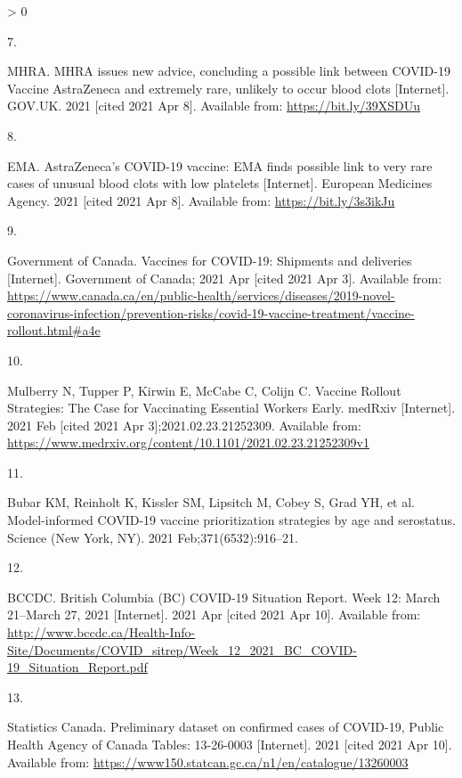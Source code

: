 \documentclass[]{elsarticle} %
\newlength{\csllabelwidth}
\newlength{\cslhangindent}
\newenvironment{CSLReferences}[3] %
 {%
  \setlength{\parindent}{0pt}
  \ifodd #1 \everypar{\setlength{\hangindent}{\cslhangindent}}\ignorespaces\fi
  \ifnum #2 > 0
  \setlength{\parskip}{#2\baselineskip}
  \fi
 }%
 {}
\newcommand{\CSLLeftMargin}[1]{\parbox[t]{\csllabelwidth}{#1}}
\newcommand{\CSLRightInline}[1]{\parbox[t]{\linewidth - \csllabelwidth}{#1}}
\begin{document}
\begin{CSLReferences}{0}{0}
\leavevmode\hypertarget{ref-mhra_mhra_2021}{}%
\CSLLeftMargin{7. }
\CSLRightInline{MHRA. {MHRA} issues new advice, concluding a possible
link between {COVID}-19 {Vaccine} {AstraZeneca} and extremely rare,
unlikely to occur blood clots {[}Internet{]}. GOV.UK. 2021 {[}cited 2021
Apr 8{]}. Available from: \url{https://bit.ly/39XSDUu}}

\leavevmode\hypertarget{ref-ema_astrazenecas_2021}{}%
\CSLLeftMargin{8. }
\CSLRightInline{EMA. {AstraZeneca}'s {COVID}-19 vaccine: {EMA} finds
possible link to very rare cases of unusual blood clots with low
platelets {[}Internet{]}. European Medicines Agency. 2021 {[}cited 2021
Apr 8{]}. Available from: \url{https://bit.ly/3s3ikJu}}

\leavevmode\hypertarget{ref-government_of_canada_vaccines_2021}{}%
\CSLLeftMargin{9. }
\CSLRightInline{Government of Canada. Vaccines for {COVID}-19:
{Shipments} and deliveries {[}Internet{]}. Government of Canada; 2021
Apr {[}cited 2021 Apr 3{]}. Available from:
\url{https://www.canada.ca/en/public-health/services/diseases/2019-novel-coronavirus-infection/prevention-risks/covid-19-vaccine-treatment/vaccine-rollout.html\#a4e}}

\leavevmode\hypertarget{ref-mulberry_vaccine_2021}{}%
\CSLLeftMargin{10. }
\CSLRightInline{Mulberry N, Tupper P, Kirwin E, McCabe C, Colijn C.
Vaccine {Rollout} {Strategies}: {The} {Case} for {Vaccinating}
{Essential} {Workers} {Early}. medRxiv {[}Internet{]}. 2021 Feb {[}cited
2021 Apr 3{]};2021.02.23.21252309. Available from:
\url{https://www.medrxiv.org/content/10.1101/2021.02.23.21252309v1}}

\leavevmode\hypertarget{ref-bubar_model-informed_2021}{}%
\CSLLeftMargin{11. }
\CSLRightInline{Bubar KM, Reinholt K, Kissler SM, Lipsitch M, Cobey S,
Grad YH, et al. Model-informed {COVID}-19 vaccine prioritization
strategies by age and serostatus. Science (New York, NY). 2021
Feb;371(6532):916--21. }

\leavevmode\hypertarget{ref-bccdc_british_2021}{}%
\CSLLeftMargin{12. }
\CSLRightInline{BCCDC. British {Columbia} ({BC}) {COVID}-19 {Situation}
{Report}. {Week} 12: {March} 21--{March} 27, 2021 {[}Internet{]}. 2021
Apr {[}cited 2021 Apr 10{]}. Available from:
\url{http://www.bccdc.ca/Health-Info-Site/Documents/COVID_sitrep/Week_12_2021_BC_COVID-19_Situation_Report.pdf}}

\leavevmode\hypertarget{ref-statistics_canada_preliminary_2021}{}%
\CSLLeftMargin{13. }
\CSLRightInline{Statistics Canada. Preliminary dataset on confirmed
cases of {COVID}-19, {Public} {Health} {Agency} of {Canada} {Tables}:
13-26-0003 {[}Internet{]}. 2021 {[}cited 2021 Apr 10{]}. Available from:
\url{https://www150.statcan.gc.ca/n1/en/catalogue/13260003}}


\end{CSLReferences}
\end{document}
